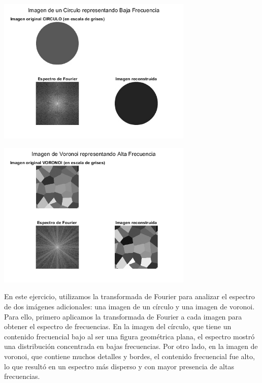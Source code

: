 \documentclass{article}
\begin{document}
\begin{minipage}{\linewidth}
  \centering
  \includegraphics[width=0.7\textwidth]{imgs/p4_1.png}
  \label{referenciarImagenAca}
\end{minipage}


\begin{minipage}{\linewidth}
  \centering
  \includegraphics[width=0.7\textwidth]{imgs/p4_2.png}
  \label{referenciarImagenAca}
\end{minipage}

En este ejercicio, utilizamos la transformada de Fourier para analizar el espectro de dos imágenes adicionales: una imagen de un círculo y una imagen de voronoi. Para ello, primero aplicamos la transformada de Fourier a cada imagen para obtener el espectro de frecuencias. En la imagen del círculo, que tiene un contenido frecuencial bajo al ser una figura geométrica plana, el espectro mostró una distribución concentrada en bajas frecuencias. Por otro lado, en la imagen de voronoi, que contiene muchos detalles y bordes, el contenido frecuencial fue alto, lo que resultó en un espectro más disperso y con mayor presencia de altas frecuencias.
\end{document}
